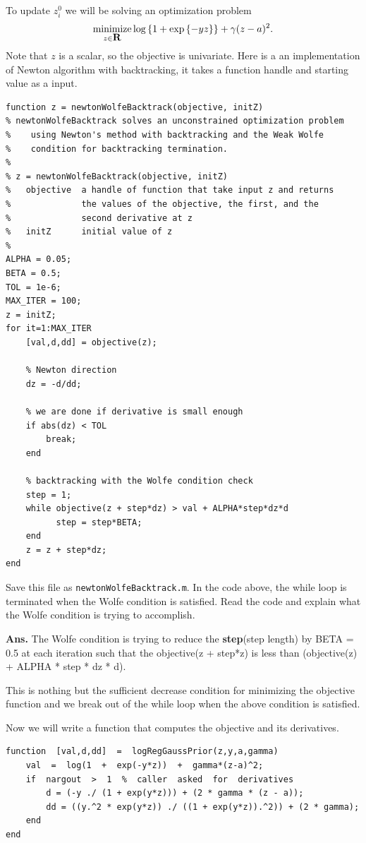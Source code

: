 \documentclass{article}
\begin{document}
{\newproblem{1pt}
To update $z^0_i$ we will be solving an optimization problem
\[
\mathop{\textrm{minimize}}_{z \in {\mbox{\bf R}}} \mathop{\rm log}\left\{1 + \mathop{\rm exp}\left\{-yz\right\}\right\} + \gamma(z - a)^2.
\]
Note that $z$ is a scalar, so the objective is univariate.
Here is a an implementation of Newton algorithm with backtracking, it takes a function handle and starting value as a input.


\begin{verbatim}
function z = newtonWolfeBacktrack(objective, initZ)
% newtonWolfeBacktrack solves an unconstrained optimization problem
%    using Newton's method with backtracking and the Weak Wolfe
%    condition for backtracking termination.
%
% z = newtonWolfeBacktrack(objective, initZ)
%   objective  a handle of function that take input z and returns
%              the values of the objective, the first, and the
%              second derivative at z
%   initZ      initial value of z
%
ALPHA = 0.05;
BETA = 0.5;
TOL = 1e-6;
MAX_ITER = 100;
z = initZ;
for it=1:MAX_ITER
    [val,d,dd] = objective(z);

    % Newton direction
    dz = -d/dd;

    % we are done if derivative is small enough
    if abs(dz) < TOL
        break;
    end

    % backtracking with the Wolfe condition check
    step = 1;
    while objective(z + step*dz) > val + ALPHA*step*dz*d
          step = step*BETA;
    end
    z = z + step*dz;
end
\end{verbatim}
Save this file as \texttt{newtonWolfeBacktrack.m}. In the code above, the while loop is terminated when the Wolfe condition is satisfied. Read the code and explain what the Wolfe condition is trying to accomplish. 

\textbf{Ans.} The Wolfe condition is trying to reduce the \textbf{step}(step length) by BETA = 0.5 at each iteration such that the objective(z + step*z) is less than (objective(z) + ALPHA * step * dz * d).

This is nothing but the sufficient decrease condition for minimizing the objective function and we break out of the while loop when the above condition is satisfied.

Now we will write a function that computes the objective and its derivatives.
\begin{verbatim}
function  [val,d,dd]  =  logRegGaussPrior(z,y,a,gamma)
    val  =  log(1  +  exp(-y*z))  +  gamma*(z-a)^2;
    if  nargout  >  1  %  caller  asked  for  derivatives
        d = (-y ./ (1 + exp(y*z))) + (2 * gamma * (z - a));
        dd = ((y.^2 * exp(y*z)) ./ ((1 + exp(y*z)).^2)) + (2 * gamma);  
    end
end
\end{verbatim}

}
\end{document}
